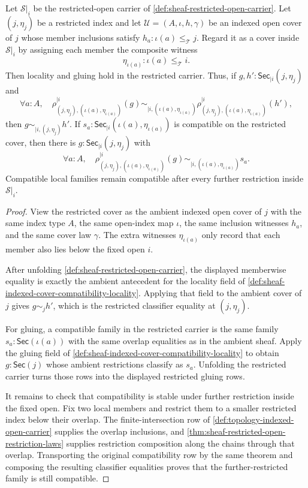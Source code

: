 \begin{theorem}
\label{thm:sheaf-restricted-open-locality-gluing}
Let $\mathcal{S}|_i$ be the restricted-open carrier of \autoref{def:sheaf-restricted-open-carrier}. Let $(j,\eta_j)$ be a restricted index and let $\mathcal{U}=(A,\iota,h,\gamma)$ be an indexed open cover of $j$ whose member inclusions satisfy $h_a:\iota(a)\le_{\mathcal{T}}j$. Regard it as a cover inside $\mathcal{S}|_i$ by assigning each member the composite witness
$$
\eta_{\iota(a)}:\iota(a)\le_{\mathcal{T}}i.
$$
Then locality and gluing hold in the restricted carrier. Thus, if $g,h':\mathsf{Sec}_{|i}(j,\eta_j)$ and
$$
\forall a:A,\quad
\rho^{|i}_{(j,\eta_j),(\iota(a),\eta_{\iota(a)})}(g)
\sim_{|i,(\iota(a),\eta_{\iota(a)})}
\rho^{|i}_{(j,\eta_j),(\iota(a),\eta_{\iota(a)})}(h'),
$$
then $g\sim_{|i,(j,\eta_j)}h'$. If $s_a:\mathsf{Sec}_{|i}(\iota(a),\eta_{\iota(a)})$ is compatible on the restricted cover, then there is $g:\mathsf{Sec}_{|i}(j,\eta_j)$ with
$$
\forall a:A,\quad
\rho^{|i}_{(j,\eta_j),(\iota(a),\eta_{\iota(a)})}(g)
\sim_{|i,(\iota(a),\eta_{\iota(a)})}
s_a.
$$
Compatible local families remain compatible after every further restriction inside $\mathcal{S}|_i$.
\end{theorem}
\begin{proof}
View the restricted cover as the ambient indexed open cover of $j$ with the same index type $A$, the same open-index map $\iota$, the same inclusion witnesses $h_a$, and the same cover law $\gamma$. The extra witnesses $\eta_{\iota(a)}$ only record that each member also lies below the fixed open $i$.

After unfolding \autoref{def:sheaf-restricted-open-carrier}, the displayed memberwise equality is exactly the ambient antecedent for the locality field of \autoref{def:sheaf-indexed-cover-compatibility-locality}. Applying that field to the ambient cover of $j$ gives $g\sim_j h'$, which is the restricted classifier equality at $(j,\eta_j)$.

For gluing, a compatible family in the restricted carrier is the same family $s_a:\mathsf{Sec}(\iota(a))$ with the same overlap equalities as in the ambient sheaf. Apply the gluing field of \autoref{def:sheaf-indexed-cover-compatibility-locality} to obtain $g:\mathsf{Sec}(j)$ whose ambient restrictions classify as $s_a$. Unfolding the restricted carrier turns those rows into the displayed restricted gluing rows.

It remains to check that compatibility is stable under further restriction inside the fixed open. Fix two local members and restrict them to a smaller restricted index below their overlap. The finite-intersection row of \autoref{def:topology-indexed-open-carrier} supplies the overlap inclusions, and \autoref{thm:sheaf-restricted-open-restriction-laws} supplies restriction composition along the chains through that overlap. Transporting the original compatibility row by the same theorem and composing the resulting classifier equalities proves that the further-restricted family is still compatible.
\end{proof}

